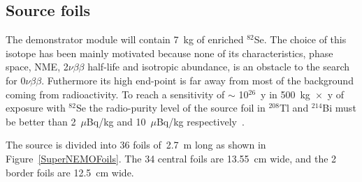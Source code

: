 \documentclass[main.tex]{subfiles}
\begin{document}
\FloatBarrier


\subsection{Source foils}\label{sec:SourceFoilsSN}


\NI The demonstrator module will contain 7~kg of enriched $^{\text{82}}$Se. The choice of this isotope has been mainly motivated because none of its characteristics, phase space, NME, 2$\nu\beta\beta$ half-life and isotropic abundance, is an obstacle to the search for 0$\nu\beta\beta$. Futhermore its high end-point is far away from most of the background coming from radioactivity. To reach a sensitivity of $\sim$ 10$^{\text{26}}$~y in 500~kg~$\times$~y of exposure with $^{\text{82}}$Se the radio-purity level of the source foil in $^{\text{208}}$Tl and $^{\text{214}}$Bi must be better than 2~$\mu$Bq/kg and 10~$\mu$Bq/kg respectively~\cite{PhysicsCaseSuperNEMO}.


\bigskip


\NI The source is divided into 36 foils of~2.7~m long as shown in Figure~\ref{SuperNEMOFoils}. The 34 central foils are 13.55~cm wide, and the 2 border foils are 12.5~cm wide.
\end{document}

